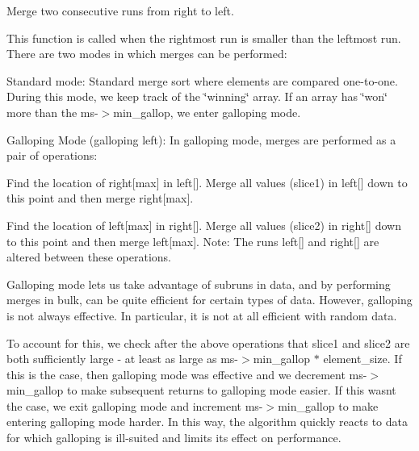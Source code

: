 Merge two consecutive runs from right to left. 

This function is called when the rightmost run is smaller than the leftmost run. There are two modes in which merges can be performed\+:

Standard mode\+: Standard merge sort where elements are compared one-\/to-\/one. During this mode, we keep track of the \char`\"{}winning\char`\"{} array. If an array has \char`\"{}won\char`\"{} more than the ms-\/$>$min\+\_\+gallop, we enter galloping mode.

Galloping Mode (galloping left)\+: In galloping mode, merges are performed as a pair of operations\+:
\begin{DoxyEnumerate}
\item Find the location of right\mbox{[}max\mbox{]} in left\mbox{[}\mbox{]}. Merge all values (slice1) in left\mbox{[}\mbox{]} down to this point and then merge right\mbox{[}max\mbox{]}.
\item Find the location of left\mbox{[}max\mbox{]} in right\mbox{[}\mbox{]}. Merge all values (slice2) in right\mbox{[}\mbox{]} down to this point and then merge left\mbox{[}max\mbox{]}. Note\+: The runs left\mbox{[}\mbox{]} and right\mbox{[}\mbox{]} are altered between these operations.
\end{DoxyEnumerate}

Galloping mode lets us take advantage of subruns in data, and by performing merges in bulk, can be quite efficient for certain types of data. However, galloping is not always effective. In particular, it is not at all efficient with random data.

To account for this, we check after the above operations that slice1 and slice2 are both sufficiently large -\/ at least as large as ms-\/$>$min\+\_\+gallop $\ast$ element\+\_\+size. If this is the case, then galloping mode was effective and we decrement ms-\/$>$min\+\_\+gallop to make subsequent returns to galloping mode easier. If this wasn\textquotesingle{}t the case, we exit galloping mode and increment ms-\/$>$min\+\_\+gallop to make entering galloping mode harder. In this way, the algorithm quickly reacts to data for which galloping is ill-\/suited and limits its effect on performance.


